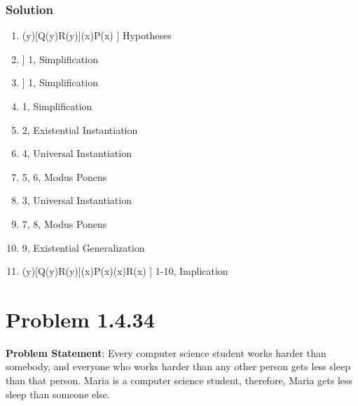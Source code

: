\documentclass[12pt]{article}
\begin{document}
\subsubsection*{Solution}
\begin{enumerate}[left=0em,labelwidth=4em,align=left]
    \item[\( (\exists x)[P(x)\rightarrow Q(x)]\land (\forall y)[Q(y)\rightarrow R(y)]\land (\forall x)P(x) \)] \hfill Hypotheses
    \item[\( (\exists x)[P(x)\rightarrow Q(x)] \)] \hfill 1, Simplification
    \item[\( (\forall y)[Q(y)\rightarrow R(y)] \)] \hfill 1, Simplification
    \item[\( (\forall x)P(x) \)] \hfill 1, Simplification
    \item[\( P(a)\rightarrow Q(a) \)] \hfill 2, Existential Instantiation
    \item[\( P(a) \)] \hfill 4, Universal Instantiation
    \item[\( Q(a) \)] \hfill 5, 6, Modus Ponens
    \item[\( Q(a)\rightarrow R(a) \)] \hfill 3, Universal Instantiation
    \item[\( R(a) \)] \hfill 7, 8, Modus Ponens
    \item[\( (\exists x)R(x) \)] \hfill 9, Existential Generalization
    \item[\( (\exists x)[P(x)\rightarrow Q(x)]\land (\forall y)[Q(y)\rightarrow R(y)]\land (\forall x)P(x)\rightarrow (\exists x)R(x) \)] \hfill 1-10, Implication
\end{enumerate}


\newpage
\section*{Problem 1.4.34}
\textbf{Problem Statement}:
Every computer science student works harder than somebody, and everyone who works harder than any other person gets less sleep than that person. Maria is a computer science student, therefore, Maria gets less sleep than someone else.
\end{document}
